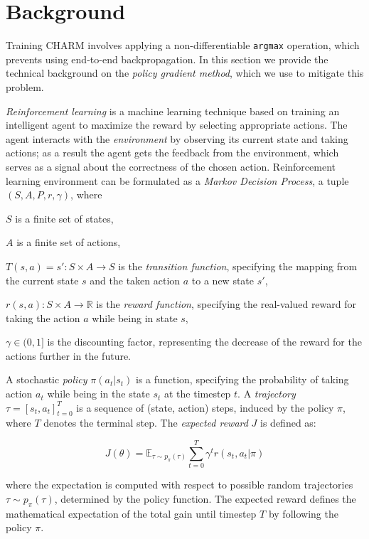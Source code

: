 \section{Background}

Training CHARM involves applying a non-differentiable \texttt{argmax} operation, which prevents using end-to-end backpropagation. In this section we provide the technical background on the \textit{policy gradient method}, which we use to mitigate this problem.

\textit{Reinforcement learning} is a machine learning technique based on training an intelligent agent to maximize the reward by selecting appropriate actions. The agent interacts with the \textit{environment} by observing its current state and taking actions; as a result the agent gets the feedback from the environment, which serves as a signal about the correctness of the chosen action. Reinforcement learning environment can be formulated as a \textit{Markov Decision Process}, a tuple $(S, A, P, r, \gamma)$, where 
\squishlist
    \item $S$ is a finite set of states,
    \item $A$ is a finite set of actions,
    \item $T(s,a) = s' : S \times A \rightarrow S$ is the \textit{transition function}, specifying the mapping from the current state $s$ and the taken action $a$ to a new state $s'$,
    \item $r(s,a) : S \times A \rightarrow \mathbb{R}$ is the \textit{reward function}, specifying the real-valued reward for taking the action $a$ while being in state $s$,
    \item $\gamma \in (0,1]$ is the discounting factor, representing the decrease of the reward for the actions further in the future.
\squishend

A stochastic \textit{policy} $\pi(a_t| s_t)$ is a function, specifying the probability of taking action $a_t$ while being in the state $s_t$ at the timestep $t$. A \textit{trajectory} $\tau = [s_t, a_t]_{t=0}^T$ is a sequence of (state, action) steps, induced by the policy $\pi$, where $T$ denotes the terminal step. The \textit{expected  reward} $J$ is defined as:

\begin{equation}
    J(\theta) = \mathbb{E}_{\tau \sim p_{\pi}(\tau)} \sum_{t=0}^{T} \gamma^t r(s_t, a_t| \pi)
\end{equation}

where the expectation is computed with respect to possible random trajectories $\tau \sim p_{\pi}(\tau)$, determined by the policy function. The expected reward defines the mathematical expectation of the total gain until timestep $T$ by following the policy $\pi$.

